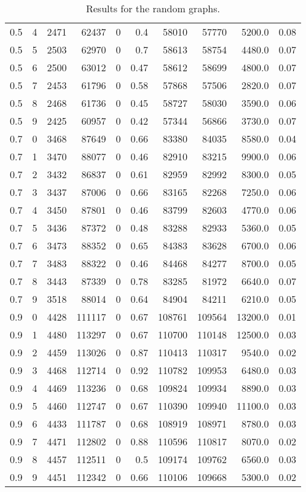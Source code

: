\documentclass{scrartcl}
\theoremstyle{plain}
\begin{document}
\begin{table}[!ht]
\begin{tabular}{|lll|rrr|rrr|r|}
 0.5 & 4 & 2471 & 62437 & 0  & 0.4 & 58010 & 57770 & 5200.0 & 0.08 \\ 
 0.5 & 5 & 2503 & 62970 & 0  & 0.7 & 58613 & 58754 & 4480.0 & 0.07 \\ 
 0.5 & 6 & 2500 & 63012 & 0  & 0.47 & 58612 & 58699 & 4800.0 & 0.07 \\ 
 0.5 & 7 & 2453 & 61796 & 0  & 0.58 & 57868 & 57506 & 2820.0 & 0.07 \\ 
 0.5 & 8 & 2468 & 61736 & 0  & 0.45 & 58727 & 58030 & 3590.0 & 0.06 \\ 
 0.5 & 9 & 2425 & 60957 & 0  & 0.42 & 57344 & 56866 & 3730.0 & 0.07 \\ 
 0.7 & 0 & 3468 & 87649 & 0  & 0.66 & 83380 & 84035 & 8580.0 & 0.04 \\ 
 0.7 & 1 & 3470 & 88077 & 0  & 0.46 & 82910 & 83215 & 9900.0 & 0.06 \\ 
 0.7 & 2 & 3432 & 86837 & 0  & 0.61 & 82959 & 82992 & 8300.0 & 0.05 \\ 
 0.7 & 3 & 3437 & 87006 & 0  & 0.66 & 83165 & 82268 & 7250.0 & 0.06 \\ 
 0.7 & 4 & 3450 & 87801 & 0  & 0.46 & 83799 & 82603 & 4770.0 & 0.06 \\ 
 0.7 & 5 & 3436 & 87372 & 0  & 0.48 & 83288 & 82933 & 5360.0 & 0.05 \\ 
 0.7 & 6 & 3473 & 88352 & 0  & 0.65 & 84383 & 83628 & 6700.0 & 0.06 \\ 
 0.7 & 7 & 3483 & 88322 & 0  & 0.46 & 84468 & 84277 & 8700.0 & 0.05 \\ 
 0.7 & 8 & 3443 & 87339 & 0  & 0.78 & 83285 & 81972 & 6640.0 & 0.07 \\ 
 0.7 & 9 & 3518 & 88014 & 0  & 0.64 & 84904 & 84211 & 6210.0 & 0.05 \\ 
 0.9 & 0 & 4428 & 111117 & 0  & 0.67 & 108761 & 109564 & 13200.0 & 0.01 \\ 
 0.9 & 1 & 4480 & 113297 & 0  & 0.67 & 110700 & 110148 & 12500.0 & 0.03 \\ 
 0.9 & 2 & 4459 & 113026 & 0  & 0.87 & 110413 & 110317 & 9540.0 & 0.02 \\ 
 0.9 & 3 & 4468 & 112714 & 0  & 0.92 & 110782 & 109953 & 6480.0 & 0.03 \\ 
 0.9 & 4 & 4469 & 113236 & 0  & 0.68 & 109824 & 109934 & 8890.0 & 0.03 \\ 
 0.9 & 5 & 4460 & 112747 & 0  & 0.67 & 110390 & 109940 & 11100.0 & 0.03 \\ 
 0.9 & 6 & 4433 & 111787 & 0  & 0.68 & 108919 & 108971 & 8780.0 & 0.03 \\ 
 0.9 & 7 & 4471 & 112802 & 0  & 0.88 & 110596 & 110817 & 8070.0 & 0.02 \\ 
 0.9 & 8 & 4457 & 112511 & 0  & 0.5 & 109174 & 109762 & 6560.0 & 0.03 \\ 
 0.9 & 9 & 4451 & 112342 & 0  & 0.66 & 110106 & 109668 & 5300.0 & 0.02 \\ 
  
\hline

\end{tabular}

	\caption{\label{tab:random_perf}Results for the random graphs.}
\end{table}
\end{document}
